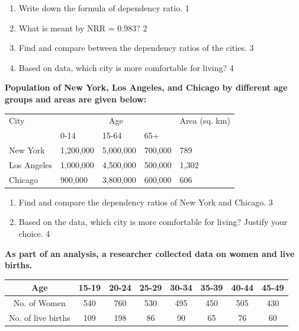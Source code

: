 \documentclass[a4paper,oneside, margin=1.4in]{book}
\begin{document}
  \begin{enumerate}
    \item
	Write down the formula of dependency ratio. \hfill 1
    \item
	What is meant by NRR = 0.983? \hfill 2
    \item  
	Find and compare between the dependency ratios of the cities. \hfill 3
    \item
	Based on data, which city is more comfortable for living? \hfill 4
  \end{enumerate}
  
  \item
  \textbf{Population of New York, Los Angeles, and Chicago by different age groups and areas are given below:} 
  
  \begin{table}[h]
  \begin{center}
  \begin{tabular}{lllll}
  City         & \multicolumn{3}{c}{Age}         & Area (sq. km) \\
               & 0-14      & 15-64    & 65+      &               \\
  New York     & 1,200,000 & 5,000,000 & 700,000  & 789           \\
  Los Angeles  & 1,000,000 & 4,500,000 & 500,000  & 1,302         \\
  Chicago      & 900,000   & 3,800,000 & 600,000  & 606           \\
  \end{tabular}
  \end{center}
  \end{table}
  
  \begin{enumerate}
    \item  
    Find and compare the dependency ratios of New York and Chicago. \hfill 3
    \item
    Based on the data, which city is more comfortable for living? Justify your
    choice. \hfill 4
  \end{enumerate}

  
  
   \item
	  \textbf{As part of an analysis, a researcher collected data on women and live births.} 
	  \begin{table}[h]
	  \centering
\begin{tabular}{c|c|c|c|c|c|c|c}
Age & 15-19 & 20-24 & 25-29 & 30-34 & 35-39 & 40-44 & 45-49 \\ \hline
No. of Women & 540 & 760 & 530 & 495 & 450 & 505 & 430 \\ \hline
No. of live births & 109 & 198 & 86 & 90 & 65 & 76 & 60
\end{tabular}
\end{table}
  
\end{document}
